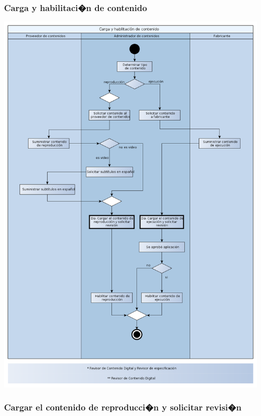 \documentclass[11pt, a4paper, spanish]{article}
\begin{document}
{\newpage

\subsubsection{Carga y habilitaci�n de contenido}

	\begin{center}
		\includegraphics[scale=0.37]{Diagramas/03-CargaYHabilitacionDeContenidoDA.png}
	\end{center}
\newpage

\subsubsection{Cargar el contenido de reproducci�n y solicitar revisi�n}

}
\end{document}
